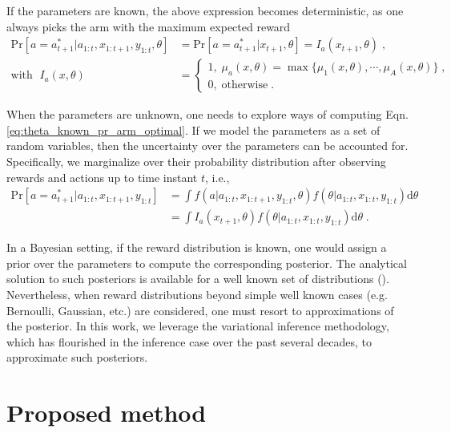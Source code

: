 \documentclass{article}
\newcommand{\ie}{i.e., }
\newcommand{\eg}{e.g. }
\begin{document}
If the parameters are known, the above expression becomes deterministic, as one always picks the arm with the maximum expected reward
\begin{equation}
\begin{split}
\mathrm{Pr}\left[a=a_{t+1}^*|a_{1:t}, x_{1:t+1}, y_{1:t},\theta \right] &= \mathrm{Pr}\left[a=a_{t+1}^*|x_{t+1}, \theta \right] = I_a(x_{t+1},\theta) \;, \\
\text{with } \; I_a(x,\theta) &= \begin{cases}
1, \; \mu_{a}(x,\theta)=\max\{\mu_1(x,\theta), \cdots, \mu_A(x,\theta)\} \;, \\
0, \; \text{otherwise} \;.
\end{cases}
\label{eq:theta_known_pr_arm_optimal}
\end{split}
\end{equation}

When the parameters are unknown, one needs to explore ways of computing Eqn. \ref{eq:theta_known_pr_arm_optimal}. If we model the parameters as a set of random variables, then the uncertainty over the parameters can be accounted for. Specifically, we marginalize over their probability distribution after observing rewards and actions up to time instant $t$, \ie
\begin{equation}
\begin{split}
\mathrm{Pr}\left[a=a_{t+1}^* \big| a_{1:t}, x_{1:t+1}, y_{1:t}\right]&=\int f(a|a_{1:t}, x_{1:t+1}, y_{1:t}, \theta) f(\theta|a_{1:t}, x_{1:t}, y_{1:t}) \mathrm{d}\theta \\
	&=\int I_a(x_{t+1}, \theta) f(\theta|a_{1:t}, x_{1:t}, y_{1:t}) \mathrm{d}\theta \; .
\end{split}
\label{eq:theta_unknown_pr_arm_optimal}
\end{equation}

In a Bayesian setting, if the reward distribution is known, one would assign a prior over the parameters to compute the corresponding posterior. The analytical solution to such posteriors is available for a well known set of distributions (\cite{b-Bernardo2009}). Nevertheless, when reward distributions beyond simple well known cases (\eg Bernoulli, Gaussian, etc.) are considered, one must resort to approximations of the posterior. In this work, we leverage the variational inference methodology,
which has flourished in the inference case over the past several decades, to approximate such posteriors. 

\section{Proposed method}
\label{sec:proposed_method}
\end{document}
